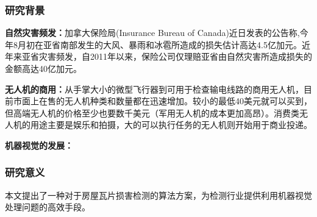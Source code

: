 \subsubsection{研究背景}
\textbf{自然灾害频发：}加拿大保险局(Insurance Bureau of Canada)近日发表的公告称,今年8月初在亚省南部发生的大风、暴雨和冰雹所造成的损失估计高达4.5亿加元。近年来亚省灾害频发，自2011年以来，保险公司仅理赔亚省由自然灾害所造成损失的金额高达40亿加元。

\textbf{无人机的商用：}从手掌大小的微型飞行器到可用于检查输电线路的商用无人机，目前市面上在售的无人机种类和数量都在迅速增加。较小的最低40美元就可以买到，但高端无人机的价格至少也要数千美元（军用无人机的成本更加高昂）。消费类无人机的用途主要是娱乐和拍摄，大的可以执行任务的无人机则开始用于商业投递。

\textbf{机器视觉的发展：}

\subsubsection{研究意义}
本文提出了一种对于房屋瓦片损害检测的算法方案，为检测行业提供利用机器视觉处理问题的高效手段。